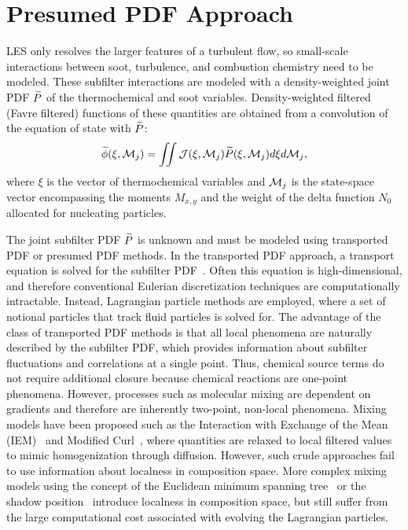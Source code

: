 \section{Presumed PDF Approach}
\label{sec:lesmodels:presumedpdf}

LES only resolves the larger features of a turbulent flow, so small-scale interactions between soot, turbulence, and combustion chemistry need to be modeled. These subfilter interactions are modeled with a density-weighted joint PDF $\widetilde{P}$ of the thermochemical and soot variables. Density-weighted filtered (Favre filtered) functions of these quantities are obtained from a convolution of the equation of state with $\widetilde{P}$:
\begin{equation}\label{eq:lesmodels:presumedpdf:filteredfuncs}
  \widetilde{\phi}(\xi,\mathcal{M}_j) = \iint \mathcal{J}(\xi,\mathcal{M}_j)\widetilde{P}(\xi,\mathcal{M}_j) d\xi d\mathcal{M}_j,
\end{equation}
where $\xi$ is the vector of thermochemical variables and $\mathcal{M}_j$ is the state-space vector encompassing the moments $M_{x,y}$ and the weight of the delta function $N_0$ allocated for nucleating particles.

The joint subfilter PDF $\widetilde{P}$ is unknown and must be modeled using transported PDF or presumed PDF methods. In the transported PDF approach, a transport equation is solved for the subfilter PDF~\cite{pope1985,pope1991}. Often this equation is high-dimensional, and therefore conventional Eulerian discretization techniques are computationally intractable. Instead, Lagrangian particle methods are employed, where a set of notional particles that track fluid particles is solved for. The advantage of the class of transported PDF methods is that all local phenomena are naturally described by the subfilter PDF, which provides information about subfilter fluctuations and correlations at a single point. Thus, chemical source terms do not require additional closure because chemical reactions are one-point phenomena. However, processes such as molecular mixing are dependent on gradients and therefore are inherently two-point, non-local phenomena. Mixing models have been proposed such as the Interaction with Exchange of the Mean (IEM)~\cite{dopazo1974} and Modified Curl~\cite{janicka1979}, where quantities are relaxed to local filtered values to mimic homogenization through diffusion. However, such crude approaches fail to use information about localness in composition space. More complex mixing models using the concept of the Euclidean minimum spanning tree~\cite{subramaniam1998} or the shadow position~\cite{pope2013} introduce localness in composition space, but still suffer from the large computational cost associated with evolving the Lagrangian particles.

